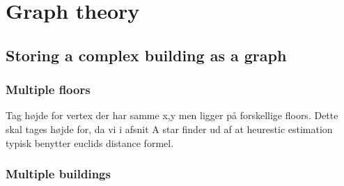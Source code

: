 \section{Graph theory}

\subsection{Storing a complex building as a graph}

\subsubsection{Multiple floors}

Tag højde for vertex der har samme x,y men ligger på forskellige floors. Dette skal tages højde for, da vi i afsnit A star finder ud af at heurestic estimation typisk benytter euclids distance formel.

\subsubsection{Multiple buildings}

